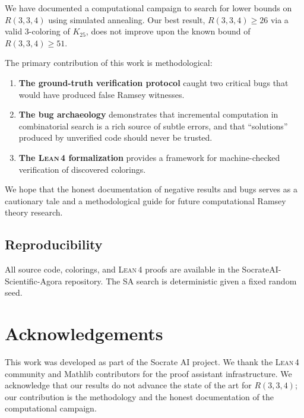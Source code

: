 \documentclass[11pt,a4paper]{article}
\theoremstyle{definition}
\theoremstyle{remark}
\newcommand{\lean}{\textsc{Lean\,4}}
\begin{document}
We have documented a computational campaign to search for lower bounds
on $R(3,3,4)$ using simulated annealing.  Our best result,
$R(3,3,4) \ge 26$ via a valid 3-coloring of $K_{25}$, does not
improve upon the known bound of $R(3,3,4) \ge 51$.

The primary contribution of this work is methodological:
\begin{enumerate}
  \item \textbf{The ground-truth verification protocol} caught two
        critical bugs that would have produced false Ramsey witnesses.
  \item \textbf{The bug archaeology} demonstrates that incremental
        computation in combinatorial search is a rich source of subtle
        errors, and that ``solutions'' produced by unverified code
        should never be trusted.
  \item \textbf{The \lean{} formalization} provides a framework for
        machine-checked verification of discovered colorings.
\end{enumerate}

We hope that the honest documentation of negative results and bugs
serves as a cautionary tale and a methodological guide for future
computational Ramsey theory research.

\subsection*{Reproducibility}

All source code, colorings, and \lean{} proofs are available in the
SocrateAI-Scientific-Agora repository.
The SA search is deterministic given a fixed random seed.


\section*{Acknowledgements}

This work was developed as part of the Socrate AI project.
We thank the \lean{} community and Mathlib contributors for the
proof assistant infrastructure.
We acknowledge that our results do not advance the state of the art
for $R(3,3,4)$; our contribution is the methodology and the honest
documentation of the computational campaign.
\end{document}
